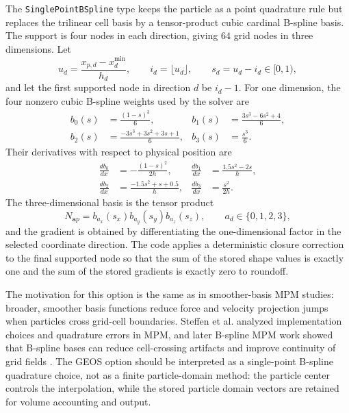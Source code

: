 The \texttt{SinglePointBSpline} type keeps the particle as a point quadrature rule but replaces the trilinear cell basis by a tensor-product cubic cardinal B-spline basis.  The support is four nodes in each direction, giving $64$ grid nodes in three dimensions.  Let
\begin{equation}
  u_d = \frac{x_{p,d}-x^{\min}_d}{h_d},
  \qquad
  i_d=\lfloor u_d\rfloor,
  \qquad
  s_d=u_d-i_d\in[0,1),
\end{equation}
and let the first supported node in direction $d$ be $i_d-1$.  For one dimension, the four nonzero cubic B-spline weights used by the solver are
\begin{align}
  b_0(s) &= \frac{(1-s)^3}{6},
  &
  b_1(s) &= \frac{3s^3-6s^2+4}{6},
  \label{eq:bspline-cubic-weights-a}\\
  b_2(s) &= \frac{-3s^3+3s^2+3s+1}{6},
  &
  b_3(s) &= \frac{s^3}{6}.
  \label{eq:bspline-cubic-weights-b}
\end{align}
Their derivatives with respect to physical position are
\begin{align}
  \frac{db_0}{dx} &= -\frac{(1-s)^2}{2h},
  &
  \frac{db_1}{dx} &= \frac{1.5s^2-2s}{h},
  \label{eq:bspline-cubic-grads-a}\\
  \frac{db_2}{dx} &= \frac{-1.5s^2+s+0.5}{h},
  &
  \frac{db_3}{dx} &= \frac{s^2}{2h}.
  \label{eq:bspline-cubic-grads-b}
\end{align}
The three-dimensional basis is the tensor product
\begin{equation}
  N_{\boldsymbol{a}p}=b_{a_x}(s_x)b_{a_y}(s_y)b_{a_z}(s_z),
  \qquad
  a_d\in\{0,1,2,3\},
  \label{eq:bspline-tensor-product}
\end{equation}
and the gradient is obtained by differentiating the one-dimensional factor in the selected coordinate direction.  The code applies a deterministic closure correction to the final supported node so that the sum of the stored shape values is exactly one and the sum of the stored gradients is exactly zero to roundoff.

The motivation for this option is the same as in smoother-basis MPM studies: broader, smoother basis functions reduce force and velocity projection jumps when particles cross grid-cell boundaries.  Steffen et al. analyzed implementation choices and quadrature errors in MPM, and later B-spline MPM work showed that B-spline bases can reduce cell-crossing artifacts and improve continuity of grid fields \cite{steffen2008quadrature,steffen2008choices,gan2018bspline}.  The GEOS option should be interpreted as a single-point B-spline quadrature choice, not as a finite particle-domain method: the particle center controls the interpolation, while the stored particle domain vectors are retained for volume accounting and output.

